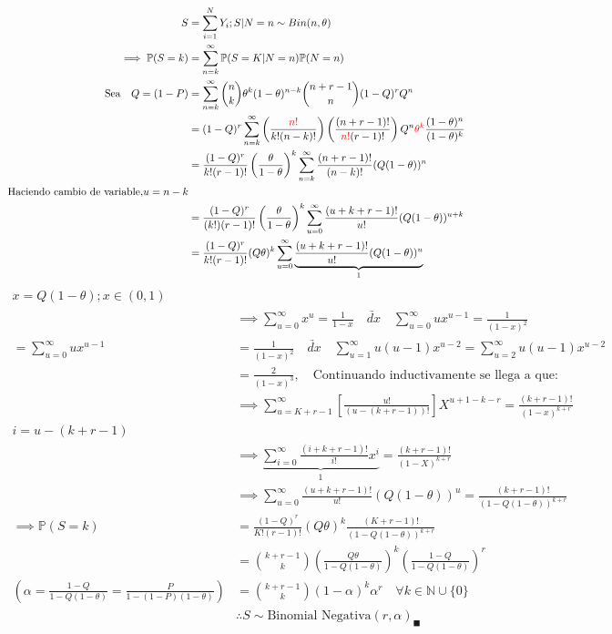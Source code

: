 \documentclass[
]{article}
\begin{document}
\begin{align*}
S &= \sum_{i = 1}^{N}Y_{i}; S|N = n \sim Bin(n,\theta)\\
\implies \mathbb{P}(S = k) &= \sum_{n = k}^{\infty} \mathbb{P}(S = K | N = n)\mathbb{P}(N = n)\\
\text{Sea} \quad Q = (1 - P) &= \sum_{n=k}^{\infty} \binom{n}{k} \theta^{k} (1 -  \theta)^{n-k} \binom{n + r - 1}{n}(1 - Q)^{r}Q^{n}\\
&= (1 - Q)^{r} \sum_{n = k}^{\infty} \left(\frac{\textcolor{red}{n!}}{k! (n - k)!}\right)\left(\frac{(n + r - 1)!}{\textcolor{red}{n!}(r-1)!}\right) Q^{n}\textcolor{red}{\theta^{k}} \frac{(1 - \theta)^{n}}{(1 - \theta)^{k}}\\
&= \frac{(1 - Q)^{r}}{k! (r - 1)!} \left(\frac{\theta}{1 - \theta}\right)^{k} \sum_{n = k}^{\infty} \frac{(n + r - 1)!}{(n - k)!}(Q(1 - \theta))^{n}\\
\text{Haciendo cambio de variable,} u = n-k\\
&= \frac{(1 - Q)^{r}}{(k!)(r - 1)!}\left(\frac{\theta}{1 - \theta}\right)^{k} \sum_{u = 0}^{\infty} \frac{(u + k + r - 1)!}{u!}(Q(1 - \theta))^{u+k}\\
&= \frac{(1 - Q)^{r}}{k!(r - 1)!}(Q \theta)^{k} \sum_{u = 0}^{\infty} \underbrace{\frac{(u + k + r - 1)!}{u!}(Q(1 - \theta))^{u}}_{1}
\end{align*} \begin{align*}
x = Q(1 - \theta); x \in (0,1)\\
&\implies \sum_{u = 0}^{\infty} x^{u} = \frac{1}{1 - x}  \quad \underrightarrow{dx} \quad \sum_{u = 0}^{\infty} ux^{u - 1}  = \frac{1}{(1 - x)^{2}}\\
= \sum_{u = 0}^{\infty} u x^{u - 1} &= \frac{1}{(1 - x)^{2}} \quad \underrightarrow{dx} \quad \sum_{u = 1}^{\infty} u(u - 1) x^{u - 2} = \sum_{u = 2}^{\infty} u(u - 1) x^{u - 2}\\
&= \frac{2}{(1 - x)^{3}}, \quad \text{Continuando inductivamente se llega a que:}\\
&\implies \sum_{u = K + r - 1}^{\infty} \left[\frac{u!}{(u - (k + r - 1))!}\right] X^{u + 1 - k - r} = \frac{(k + r - 1)!}{(1 - x)^{k + r}}\\
i = u - (k + r - 1)\\
&\implies \underbrace{\sum_{i = 0}^{\infty} \frac{(i + k + r -1)!}{i!} x^{i}}_{1} = \frac{(k + r - 1)!}{(1 - X)^{k + r}}\\
&\implies \sum_{u = 0}^{\infty} \frac{(u + k + r - 1)!}{u!} (Q(1 - \theta))^{u} = \frac{(k + r - 1)!}{(1 - Q(1 - \theta))^{k+ r}}\\
\implies \mathbb{P}(S = k) &= \frac{(1 - Q)^{r}}{K! (r - 1)!}(Q\theta)^{k} \frac{(K + r -1)!}{(1 - Q (1 - \theta))^{k + r}}\\
&= \binom{k + r - 1}{k} \left(\frac{Q\theta}{1 - Q(1 - \theta)}\right)^{k} \left(\frac{1 - Q}{1 - Q(1 - \theta)}\right)^{r}\\
\left(\alpha = \frac{1 - Q}{1 - Q(1 - \theta)} = \frac{P}{1 - (1 - P)(1 - \theta)}\right) &= \binom{k + r -1}{k} (1 - \alpha)^{k} \alpha^{r} \quad \forall k \in \mathbb{N}\cup\{0\}\\
&\therefore S \sim \text{Binomial Negativa}(r, \alpha)_\blacksquare
\end{align*}
\end{document}
